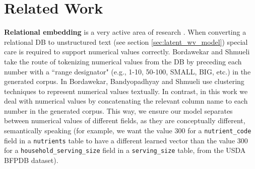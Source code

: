 \section{Related Work}
\textbf{Relational embedding} is a very active area of research \cite{DBLP:journals/corr/abs-1803-01384, sigmod2020_keynote, pie2020_keynote}.
When converting a relational DB to unstructured text (see section \ref{sec:latent_wv_model}) special care is required to support numerical values correctly. Bordawekar and Shmueli \cite{DBLP:journals/corr/BordawekarS16} take the route of tokenizing numerical values from the DB by preceding each number with a ``range designator" (e.g., 1-10, 50-100, SMALL, BIG, etc.) in the generated corpus. In \cite{DBLP:journals/corr/abs-1712-07199} Bordawekar, Bandyopadhyay and Shmueli use clustering techniques to represent numerical values textually. In contrast, in this work we deal with numerical values by concatenating the relevant column name to each number in the generated corpus. This way, we ensure our model separates between numerical values of different fields, as they are conceptually different, semantically speaking (for example, we want the value 300 for a \texttt{nutrient\_code} field in a \texttt{nutrients} table to have a different learned vector than the value 300 for a \texttt{household\_serving\_size} field in a \texttt{serving\_size} table, from the USDA BFPDB \cite{usda_bfpd-dataset} dataset). 



